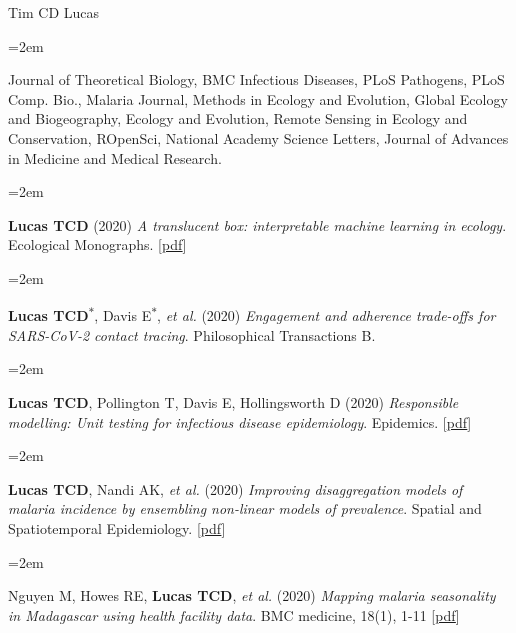 \documentclass{scrartcl}
\newcommand{\MarginText}[1]{\marginpar{\raggedleft\itshape\small#1}} %
\newcommand{\Description}[1]{\hangindent=2em\hangafter=0\noindent\raggedright\footnotesize{#1}\par\normalsize\vspace{1em}} %
\begin{document}
\begin{cv}{Tim {\Large CD} Lucas}
\vspace{-0.5em} %


\Description{Journal of Theoretical Biology, BMC Infectious Diseases, PLoS Pathogens, PLoS Comp. Bio., Malaria Journal, Methods in Ecology and Evolution, Global Ecology and Biogeography, Ecology and Evolution, Remote Sensing in Ecology and Conservation, ROpenSci, National Academy Science Letters, Journal of Advances in Medicine and Medical Research.}




\vspace{2em} %

{\color{Maroon}}\vspace{1em}



\Description{\MarginText{2020}\textbf{Lucas TCD} (2020) \emph{A translucent box: interpretable machine learning in ecology}. Ecological Monographs. [\href{https://esajournals.onlinelibrary.wiley.com/doi/epdf/10.1002/ecm.1422}{pdf}]}

\Description{\textbf{Lucas TCD}\textsuperscript{$\ast$}, Davis E\textsuperscript{$\ast$}, \emph{et al.} (2020) \emph{Engagement and adherence trade-offs for SARS-CoV-2 contact tracing}. Philosophical Transactions B.}


\Description{\textbf{Lucas TCD}, Pollington T, Davis E, Hollingsworth D (2020) \emph{Responsible modelling: Unit testing for infectious disease epidemiology}. Epidemics. [\href{https://reader.elsevier.com/reader/sd/pii/S1755436520300451?token=EFE3827EEEAD174495EF4589DB27310D4907E4BC4F92C1795B3EF7DC57795E1C0E23D4E5A3D5002C8C7B679916003423}{pdf}]}

\Description{\textbf{Lucas TCD}, Nandi AK,  \emph{et al.} (2020) \emph{ Improving disaggregation models of malaria incidence by ensembling non-linear models of prevalence}. Spatial and Spatiotemporal Epidemiology. [\href{https://reader.elsevier.com/reader/sd/pii/S1877584520300356?token=A7B0EF0114C0A057AD7F1E13B7F97FE4D359B945C1F09211AC50B77D272216014E3E9881E3FBFC7D3CA8A8DD5A78846A}{pdf}]}

\Description{Nguyen M, Howes RE, \textbf{Lucas TCD},  \emph{et al.} (2020) \emph{Mapping malaria seasonality in Madagascar using health facility data}. BMC medicine, 18(1), 1-11 [\href{https://bmcmedicine.biomedcentral.com/track/pdf/10.1186/s12916-019-1486-3}{pdf}]}



\end{cv}
\end{document}
